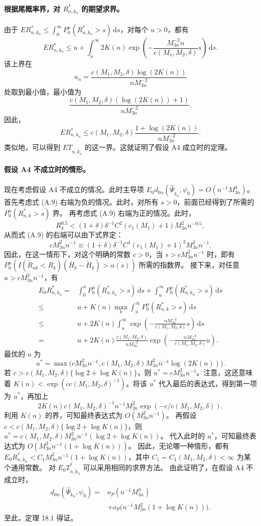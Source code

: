 \paragraph{根据尾概率界，对 $R^*_{n,k_n}$ 的期望求界。}
由于
$ER^*_{n,k_n}\le\int_0^\infty P_0^n(R^*_{n,k_n}>s)\,\mathrm ds$，对每个 $u>0$，都有
\[
ER^*_{n,k_n}\le u+\int_u^\infty2K(n)
 \exp\left(-\frac{M_{3n}^{-2}n}{c(M_1,M_2,\delta)}s\right)\,\mathrm ds.
\]
该上界在
\[
u_n=\frac{c(M_1,M_2,\delta)\log(2K(n))}{nM_{3n}^{-2}}
\]
处取到最小值，最小值为
\[
\frac{c(M_1,M_2,\delta)(\log(2K(n))+1)}{nM_{3n}^{-2}}.
\]
因此，
\[
ER^*_{n,k_n}\le c(M_1,M_2,\delta)
 \frac{1+\log(2K(n))}{nM_{3n}^{-2}}.
\]
类似地，可以得到 $ET_{n,\widetilde k_n}$ 的这一界。这就证明了假设 A4 成立时的定理。

\paragraph{假设 A4 不成立时的情形。}
现在考虑假设 A4 不成立的情况。此时主导项
$E_0d_{0n}(\widehat\Psi_{\widetilde k_n},\psi_0)=O(n^{-1}M_{3n}^3)$。
首先考虑式 (A.9) 右端为负的情况。此时，对所有 $s>0$，前面已经得到了所需的 $P_0^n(R^*_{n,k}>s)$ 界。
再考虑式 (A.9) 右端为正的情况。此时，
\[
R_k^{0.5}<(1+\delta)\delta^{-1}C^2(c_1(M_1)+1)M_{3n}^2n^{-0.5},
\]
从而式 (A.9) 的右端可以由下式界定：
\[
cM_{3n}^2n^{-1}\equiv
 (1+\delta)\delta^{-1}C^4(c_1(M_1)+1)^2M_{3n}^2n^{-1}.
\]
因此，在这一情形下，对这个明确的常数 $c>0$，当
$s>cM_{3n}^2n^{-1}$ 时，即有
$P_0^n(I(\widetilde R_{nk}<R_k)(\bar H_k-\widetilde H_k)>\alpha(s))$
所需的指数界。
接下来，对任意 $u>cM_{3n}^2n^{-1}$，有
\[
\begin{aligned}
E_0R^*_{n,k_n}
={}&\int_0^uP_0^n(R^*_{n,k_n}>s)\,\mathrm ds
 +\int_u^\infty P_0^n(R^*_{n,k_n}>s)\,\mathrm ds\\
\le{}&u+K(n)\max_k\int_u^\infty P_0^n(R^*_{n,k}>s)\,\mathrm ds\\
\le{}&u+2K(n)\int_u^\infty
 \exp\left(-\frac{nM_{3n}^{-2}}{c(M_1,M_2,\delta)}s\right)\,\mathrm ds\\
={}&u+2K(n)\frac{c(M_1,M_2,\delta)}{nM_{3n}^{-2}}
 \exp\left(-\frac{nM_{3n}^{-2}}{c(M_1,M_2,\delta)}u\right).
\end{aligned}
\]
最优的 $u$ 为
\[
u^*=\max\bigl(cM_{3n}^2n^{-1},
 c(M_1,M_2,\delta)M_{3n}^2n^{-1}\log(2K(n))\bigr).
\]
若 $c>c(M_1,M_2,\delta)\{\log2+\log K(n)\}$，则
$u^*=cM_{3n}^2n^{-1}$。注意，这还意味着
$K(n)<\exp(cc(M_1,M_2,\delta)^{-1})$。将该 $u^*$ 代入最后的表达式，得到第一项为 $u^*$，再加上
\[
2K(n)c(M_1,M_2,\delta)^{-1}n^{-1}M_{3n}^2
 \exp(-c/c(M_1,M_2,\delta)).
\]
利用 $K(n)$ 的界，可知最终表达式为 $O(M_{3n}^2n^{-1})$。
再假设 $c<c(M_1,M_2,\delta)\{\log2+\log K(n)\}$，则
$u^*=c(M_1,M_2,\delta)M_{3n}^2n^{-1}(\log2+\log K(n))$。
代入此时的 $u^*$，可知最终表达式为
$O(M_{3n}^2n^{-1}(1+\log K(n)))$。
因此，无论哪一种情形，都有
$E_0R^*_{n,k_n}<C_1M_{3n}^2n^{-1}(1+\log K(n))$，其中
$C_1=C_1(M_1,M_2,\delta)<\infty$ 为某个通用常数。
对 $E_0T^*_{n,\widetilde k_n}$ 可以采用相同的求界方法。
由此证明了，在假设 A4 不成立时，
\[
\begin{aligned}
d_{0n}(\widehat\Psi_{k_n},\psi_0)
={}&o_P(n^{-1}M_{3n}^3)\\
&+o_P\bigl(n^{-1}M_{3n}^2(1+\log K(n))\bigr).
\end{aligned}
\]
至此，定理 18.1 得证。
